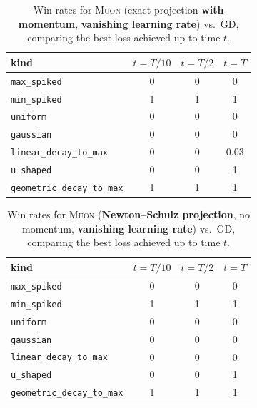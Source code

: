\documentclass{article}
\theoremstyle{plain}
\theoremstyle{definition}
\theoremstyle{remark}
\newcommand{\GD}{\textsc{GD}}
\newcommand{\Muon}{\textsc{Muon}}
\begin{document}
\begin{table}[H]
\centering
\small
\setlength{\tabcolsep}{3pt}
\renewcommand{\arraystretch}{1.15}
\caption{Win rates for \Muon{} (exact projection \textbf{with momentum}, \textbf{vanishing learning rate})
vs.\ \GD{}, comparing the best loss achieved up to time $t$.}
\label{tab:vanishing-exact-mom}
\begin{tabular}{lccc}
\toprule
kind & $t=T/10$ & $t=T/2$ & $t=T$ \\
\midrule
\texttt{max\_spiked}              & 0   & 0   & 0   \\
\texttt{min\_spiked}              & 1   & 1   & 1   \\
\texttt{uniform}                & 0   & 0   & 0   \\
\texttt{gaussian}               & 0   & 0   & 0   \\
\texttt{linear\_decay\_to\_max} & 0   & 0   & 0.03\\
\texttt{u\_shaped}       & 0   & 0   & 1   \\
\texttt{geometric\_decay\_to\_max}          & 1   & 1   & 1   \\
\bottomrule
\end{tabular}
\end{table}


\begin{table}[H]
\centering
\small
\setlength{\tabcolsep}{3pt}
\renewcommand{\arraystretch}{1.15}
\caption{Win rates for \Muon{} (\textbf{Newton--Schulz projection}, no momentum, \textbf{vanishing learning rate})
vs.\ \GD{}, comparing the best loss achieved up to time $t$.}
\label{tab:vanishing-inexact-nomom}
\begin{tabular}{lccc}
\toprule
kind & $t=T/10$ & $t=T/2$ & $t=T$ \\
\midrule
\texttt{max\_spiked}              & 0 & 0 & 0 \\
\texttt{min\_spiked}              & 1 & 1 & 1 \\
\texttt{uniform}                & 0 & 0 & 0 \\
\texttt{gaussian}               & 0 & 0 & 0 \\
\texttt{linear\_decay\_to\_max} & 0 & 0 & 0 \\
\texttt{u\_shaped}       & 0 & 0 & 1 \\
\texttt{geometric\_decay\_to\_max}          & 1 & 1 & 1 \\
\bottomrule
\end{tabular}
\end{table}
\end{document}
